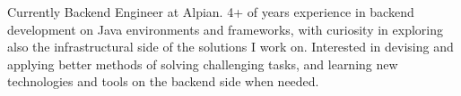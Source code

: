 

\begin{cvparagraph}
	
	Currently Backend Engineer at Alpian. 4+ of years experience in backend development on Java environments and frameworks, with curiosity in exploring also the infrastructural side of the solutions I work on. Interested in devising and applying better methods of solving challenging tasks, and learning new technologies and tools on the backend side when needed.
\end{cvparagraph}